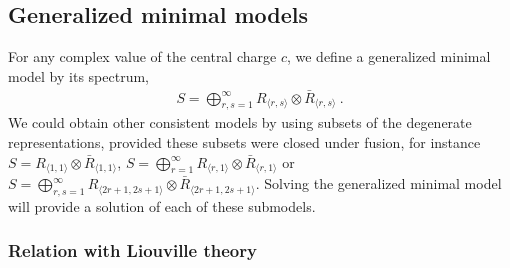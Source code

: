 \documentclass[12pt, a4paper, notitlepage, twoside]{report}
\numberwithin{equation}{section}
\theoremstyle{break}
\begin{document}
\subsection{Generalized minimal models}

For any complex value of the central charge $c$, we define a generalized minimal model by its spectrum,
\begin{align}
 \boxed{S = \bigoplus_{r,s=1}^\infty R_{\langle r,s \rangle}\otimes \bar{R}_{\langle r,s \rangle}}\ .
\end{align}
We could obtain other consistent models by using subsets of the degenerate representations, provided these subsets were closed under fusion, for instance $S=R_{\langle 1,1 \rangle}\otimes \bar{R}_{\langle 1,1 \rangle}$, $S=\bigoplus_{r=1}^\infty R_{\langle r,1 \rangle}\otimes \bar{R}_{\langle r,1 \rangle}$ or $S=\bigoplus_{r,s=1}^{\infty} R_{\langle 2r+1,2s+1 \rangle}\otimes \bar{R}_{\langle 2r+1,2s+1 \rangle}$.
Solving the generalized minimal model will provide a solution of each of these submodels. 

\subsubsection{Relation with Liouville theory}
\end{document}
